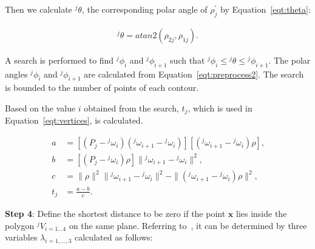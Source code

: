 Then we calculate ${^j\theta}$, the corresponding polar angle of $\rho^{\prime}_j$ by Equation~\ref{eqt:theta}:

\begin{equation}
\begin{aligned}
{^j\theta} = atan2 \left ( \rho_{2j},\rho_{1j} \right ) \mbox{.}
\end{aligned}
\label{eqt:theta}
\end{equation}

A search is performed to find ${^j\phi_i}$ and ${^j\phi_{i+1}}$ such that ${^j\phi_i} \leq {^j\theta} \leq {^j\phi_{i+1}}$.
The polar angles $^j\phi_i$ and ${^j\phi_{i+1}}$ are calculated from Equation~\ref{eqt:preprocess2}.
The search is bounded to the number of points of each contour.


Based on the value $i$ obtained from the search, $t_j$, which is used in Equation~\ref{eqt:vertices}, is calculated.

\begin{equation}
\begin{aligned}
a &= [(P_j-{^j\omega}_i)({^j\omega}_{i+1}-{^j\omega}_i)][({^j\omega}_{i+1}-{^j\omega}_i)\rho] \mbox{,} \\
b &= [(P_j-{^j\omega}_i)\rho]\|{^j\omega}_{i+1}-{^j\omega}_i\|^2 \mbox{,} \\
c &= \|\rho\|^2\|{^j\omega}_{i+1}-{^j\omega}_i\|^2-\|({^j\omega}_{i+1}-{^j\omega}_i)\rho\|^2 \mbox{,} \\
t_j &= \frac{a-b}{c} \mbox{.}
\end{aligned}
\label{eqt:t}
\end{equation}

\noindent \textbf{Step 4}:
Define the shortest distance to be zero if the point $\textbf{x}$ lies inside the polygon $^jV_{i=1...4}$ on the same plane.
Referring to~\cite{preparata85}, it can be determined by three variables $\lambda_{i=1,...,3}$ calculated as follows:

